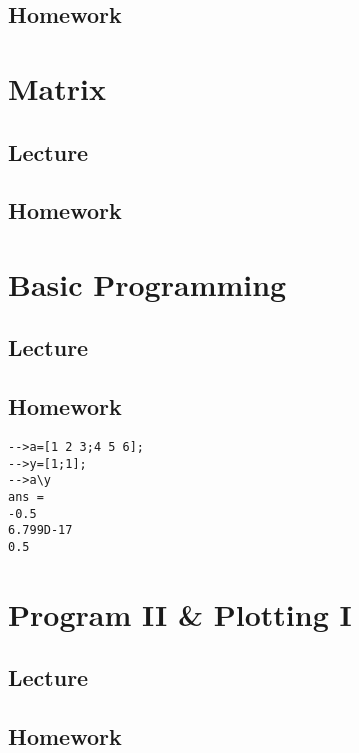 \documentclass[a4paper]{book}
\begin{document}
\section{Homework}



\chapter{Matrix}
\section{Lecture}

\section{Homework}



\chapter{Basic Programming}
\section{Lecture}

\section{Homework}


\begin{lstlisting}
-->a=[1 2 3;4 5 6];
-->y=[1;1];
-->a\y
ans =
-0.5
6.799D-17
0.5
\end{lstlisting}

\chapter{Program II \& Plotting I}
\section{Lecture}

\section{Homework}

\end{document}
